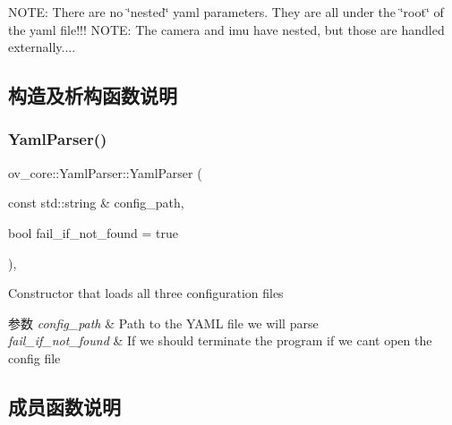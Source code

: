 N\+O\+TE\+: There are no \char`\"{}nested\char`\"{} yaml parameters. They are all under the \char`\"{}root\char`\"{} of the yaml file!!! N\+O\+TE\+: The camera and imu have nested, but those are handled externally.... 

\subsection{构造及析构函数说明}
\mbox{\label{classov__core_1_1YamlParser_a4f4acc860b546d60f422a07d60eaa99b}} 
\subsubsection{\texorpdfstring{Yaml\+Parser()}{YamlParser()}}
{\footnotesize\ttfamily ov\+\_\+core\+::\+Yaml\+Parser\+::\+Yaml\+Parser (\begin{DoxyParamCaption}\item[{const std\+::string \&}]{config\+\_\+path,  }\item[{bool}]{fail\+\_\+if\+\_\+not\+\_\+found = {\ttfamily true} }\end{DoxyParamCaption})\hspace{0.3cm}{\ttfamily [inline]}, {\ttfamily [explicit]}}



Constructor that loads all three configuration files 


\begin{DoxyParams}{参数}
{\em config\+\_\+path} & Path to the Y\+A\+ML file we will parse \\
\hline
{\em fail\+\_\+if\+\_\+not\+\_\+found} & If we should terminate the program if we can\textquotesingle{}t open the config file \\
\hline
\end{DoxyParams}


\subsection{成员函数说明}
\mbox{\label{classov__core_1_1YamlParser_a76a8ca471859dd6fd22e1772c3d1aa44}} 
